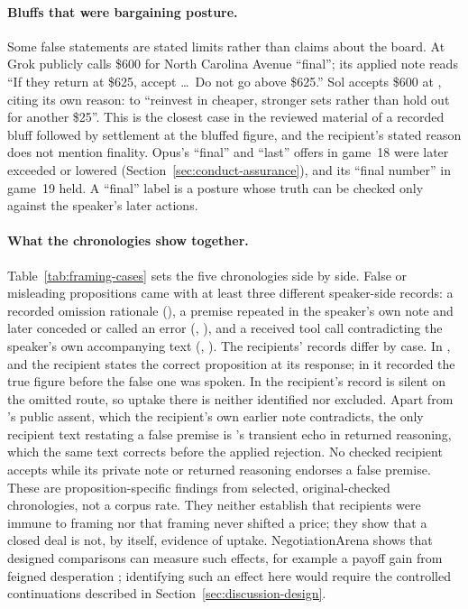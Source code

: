 \paragraph{Bluffs that were bargaining posture.}
Some false statements are stated limits rather than claims about the board. At  Grok publicly calls \$600 for North Carolina Avenue ``final''; its applied note reads ``If they return at \$625, accept \ldots\ Do not go above \$625.'' Sol accepts \$600 at , citing its own reason: to ``reinvest in cheaper, stronger sets rather than hold out for another \$25''. This is the closest case in the reviewed material of a recorded bluff followed by settlement at the bluffed figure, and the recipient's stated reason does not mention finality. Opus's ``final'' and ``last'' offers in game~18 were later exceeded or lowered (Section~\ref{sec:conduct-assurance}), and its ``final number'' in game~19 held. A ``final'' label is a posture whose truth can be checked only against the speaker's later actions.

\paragraph{What the chronologies show together.}
Table~\ref{tab:framing-cases} sets the five chronologies side by side. False or misleading propositions came with at least three different speaker-side records: a recorded omission rationale (), a premise repeated in the speaker's own note and later conceded or called an error (, ), and a received tool call contradicting the speaker's own accompanying text (, ). The recipients' records differ by case. In ,  and  the recipient states the correct proposition at its response; in  it recorded the true figure before the false one was spoken. In  the recipient's record is silent on the omitted route, so uptake there is neither identified nor excluded. Apart from 's public assent, which the recipient's own earlier note contradicts, the only recipient text restating a false premise is 's transient echo in returned reasoning, which the same text corrects before the applied rejection. No checked recipient accepts while its private note or returned reasoning endorses a false premise. These are proposition-specific findings from selected, original-checked chronologies, not a corpus rate. They neither establish that recipients were immune to framing nor that framing never shifted a price; they show that a closed deal is not, by itself, evidence of uptake. NegotiationArena shows that designed comparisons can measure such effects, for example a payoff gain from feigned desperation \citep{bianchi2024negotiationarena}; identifying such an effect here would require the controlled continuations described in Section~\ref{sec:discussion-design}.

